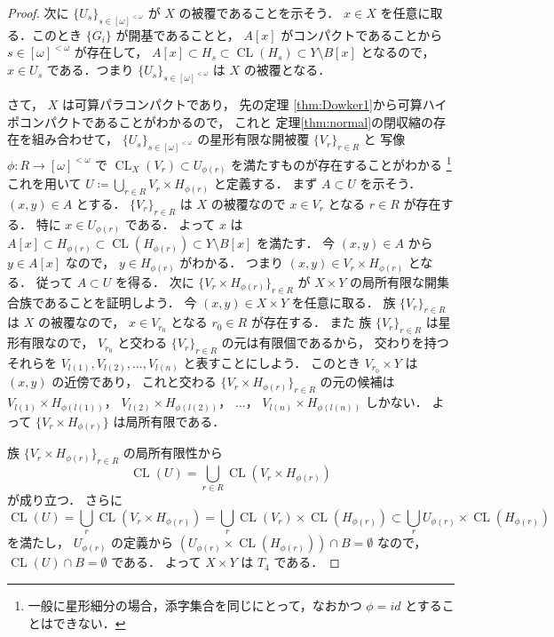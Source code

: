 \documentclass[leqno, 12pt]{ltjsarticle}
\newcommand{\FinSubsets}[1]{[#1]^{<\omega}}
\newcommand{\slice}[2]{#1[#2]}
\DeclareMathOperator{\cl}{CL}
\begin{document}
\begin{proof}
次に
$\{U_{s}\}_{s\in \FinSubsets{\omega}}$
が
$X$
の被覆であることを示そう．
$x\in X$
を任意に取る．このとき
$\{G_{i}\}$
が開基であることと，
$\slice{A}{x}$
がコンパクトであることから
$s\in\FinSubsets{\omega}$
が存在して，
$\slice{A}{x}\subset H_{s}\subset \cl(H_{s})\subset Y\setminus \slice{B}{x}$
となるので，
$x\in U_{s}$
である．つまり
$\{U_{s}\}_{s\in \FinSubsets{\omega}}$
は
$X$
の被覆となる．


さて，
$X$
は可算パラコンパクトであり，
先の定理
\ref{thm:Dowker1}から可算ハイポコンパクトであることがわかるので，
これと
定理\ref{thm:normal}の閉収縮の存在を組み合わせて，
$\{U_{s}\}_{s\in \FinSubsets{\omega}}$
の星形有限な開被覆
$\{V_{r}\}_{r\in R}$
と
写像
$\phi\colon R\to \FinSubsets{\omega}$
で
$\cl_{X}(V_{r})\subset U_{\phi(r)}$
を満たすものが存在することがわかる
\footnote{一般に星形細分の場合，添字集合を同じにとって，なおかつ
$\phi=id$
とすることはできない．}
これを用いて
$U\coloneqq\bigcup_{r\in R}V_{r}\times H_{\phi(r)}$
と定義する．
まず
$A\subset U$
を示そう．
$(x,y)\in A$
とする．
$\{V_{r}\}_{r\in R}$
は
$X$
の被覆なので
$x\in V_{r}$
となる
$r\in R$
が存在する．
特に
$x\in U_{\phi(r)}$
である．
よって
$x$
は
$\slice{A}{x}\subset H_{\phi(r)}\subset \cl(H_{\phi(r)})\subset Y\setminus \slice{B}{x}$
を満たす．
今
$(x, y)\in A$
から
$y\in \slice{A}{x}$
なので，
$y\in H_{\phi(r)}$
がわかる．
つまり
$(x, y)\in V_{r}\times H_{\phi(r)}$
となる．
従って
$A\subset U$
を得る．
 次に
 $\{V_{r}\times H_{\phi(r)}\}_{r\in R}$
 が
 $X\times Y$
 の局所有限な開集合族であることを証明しよう．
 今
 $(x,y)\in X\times Y$
 を任意に取る．
 族
 $\{V_{r}\}_{r\in R}$
 は
 $X$
 の被覆なので，
 $x\in V_{r_{0}}$
 となる
 $r_{0}\in R$
 が存在する．
また 族
$\{V_{r}\}_{r\in R}$
は星形有限なので，
$V_{r_{0}}$
と交わる
$\{V_{r}\}_{r\in R}$
の元は有限個であるから，
交わりを持つそれらを
$V_{l(1)},V_{l(2)},\dots, V_{l(n)}$
と表すことにしよう．
このとき
$V_{r_{0}}\times Y$
は
$(x, y)$
の近傍であり，
これと交わる
$\{V_{r}\times H_{\phi(r)}\}_{r\in R}$
の元の候補は
$V_{l(1)}\times H_{\phi(l(1))}$，
$V_{l(2)}\times H_{\phi(l(2))}$，
$\dots$，
$V_{l(n)}\times H_{\phi(l(n))}$
しかない．
よって
$\{V_{r}\times H_{\phi(r)}\}$
は局所有限である．

族
$\{V_{r}\times H_{\phi(r)}\}_{r\in R}$
の局所有限性から
\[
\cl(U)=\bigcup_{r\in R}\cl(V_{r}\times H_{\phi(r)})
\]
が成り立つ．
さらに
\[
\cl(U)=\bigcup_{r}\cl(V_{r}\times H_{\phi(r)})=\bigcup_{r}\cl(V_{r})\times \cl(H_{\phi(r)})\subset \bigcup_{r}U_{\phi(r)}\times \cl(H_{\phi(r)})
\]
を満たし，
$U_{\phi(r)}$
の定義から
$(U_{\phi(r)}\times \cl(H_{\phi(r)}))\cap B=\emptyset$
なので，
$\cl(U)\cap B=\emptyset$
である．
よって
$X\times Y$
は
$T_{4}$
である．



\end{proof}
\end{document}

